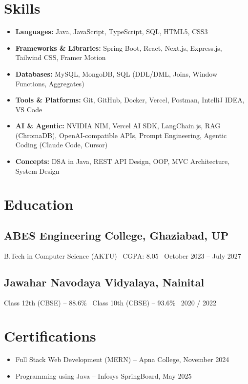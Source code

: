 \documentclass[11pt,letterpaper]{article}
\begin{document}
\section*{Skills}
\begin{itemize}
    \item \textbf{Languages:} Java, JavaScript, TypeScript, SQL, HTML5, CSS3
    \item \textbf{Frameworks \& Libraries:} Spring Boot, React, Next.js, Express.js, Tailwind CSS, Framer Motion
    \item \textbf{Databases:} MySQL, MongoDB, SQL (DDL/DML, Joins, Window Functions, Aggregates)
    \item \textbf{Tools \& Platforms:} Git, GitHub, Docker, Vercel, Postman, IntelliJ IDEA, VS Code
    \item \textbf{AI \& Agentic:} NVIDIA NIM, Vercel AI SDK, LangChain.js, RAG (ChromaDB), OpenAI-compatible APIs, Prompt Engineering, Agentic Coding (Claude Code, Cursor)
    \item \textbf{Concepts:} DSA in Java, REST API Design, OOP, MVC Architecture, System Design
\end{itemize}

\section*{Education}

\subsection*{ABES Engineering College, Ghaziabad, UP}
B.Tech in Computer Science (AKTU) \textbullet\ CGPA: 8.05 \textbullet\ October 2023 -- July 2027

\subsection*{Jawahar Navodaya Vidyalaya, Nainital}
Class 12th (CBSE) -- 88.6\% \textbullet\ Class 10th (CBSE) -- 93.6\% \textbullet\ 2020 / 2022

\section*{Certifications}
\begin{itemize}
    \item Full Stack Web Development (MERN) -- Apna College, November 2024
    \item Programming using Java -- Infosys SpringBoard, May 2025
\end{itemize}
\end{document}
